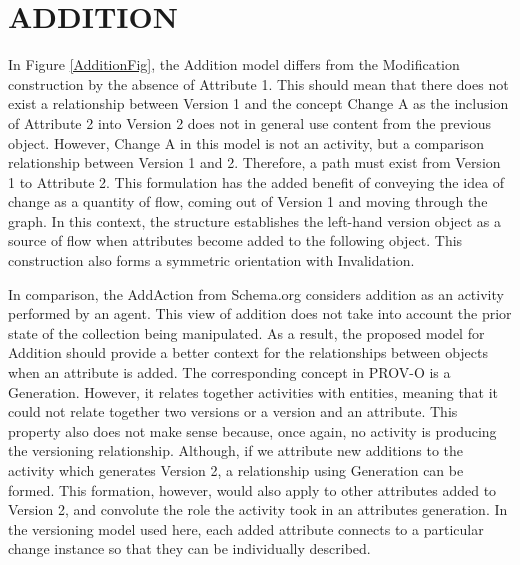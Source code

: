 \section{ADDITION}

In Figure \ref{AdditionFig}, the Addition model differs from the Modification construction by the absence of Attribute 1.
This should mean that there does not exist a relationship between Version 1 and the concept Change A as the inclusion of Attribute 2 into Version 2 does not in general use content from the previous object.
However, Change A in this model is not an activity, but a comparison relationship between Version 1 and 2.
Therefore, a path must exist from Version 1 to Attribute 2.
This formulation has the added benefit of conveying the idea of change as a quantity of flow, coming out of Version 1 and moving through the graph.
In this context, the structure establishes the left-hand version object as a source of flow when attributes become added to the following object.
This construction also forms a symmetric orientation with Invalidation.

In comparison, the AddAction from Schema.org considers addition as an activity performed by an agent.
This view of addition does not take into account the prior state of the collection being manipulated.
As a result, the proposed model for Addition should provide a better context for the relationships between objects when an attribute is added.
The corresponding concept in PROV-O is a Generation.
However, it relates together activities with entities, meaning that it could not relate together two versions or a version and an attribute.
This property also does not make sense because, once again, no activity is producing the versioning relationship.
Although, if we attribute new additions to the activity which generates Version 2, a relationship using Generation can be formed.
This formation, however, would also apply to other attributes added to Version 2, and convolute the role the activity took in an attributes generation.
In the versioning model used here, each added attribute connects to a particular change instance so that they can be individually described.

